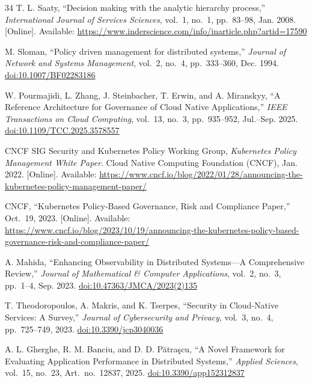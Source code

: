\documentclass[conference]{IEEEtran}
\begin{document}
\begin{thebibliography}{34}
T. L. Saaty, ``Decision making with the analytic hierarchy process,'' \textit{International Journal of Services Sciences}, vol.~1, no.~1, pp.~83--98, Jan. 2008. [Online]. Available:
\url{https://www.inderscience.com/info/inarticle.php?artid=17590}

M. Sloman, ``Policy driven management for distributed systems,'' \textit{Journal of Network and Systems Management}, vol.~2, no.~4, pp.~333--360, Dec. 1994.
\href{https://doi.org/10.1007/BF02283186}{doi:10.1007/BF02283186}

W. Pourmajidi, L. Zhang, J. Steinbacher, T. Erwin, and A. Miranskyy, ``A Reference Architecture for Governance of Cloud Native Applications,'' \textit{IEEE Transactions on Cloud Computing}, vol.~13, no.~3, pp.~935--952, Jul.--Sep. 2025.
\href{https://doi.org/10.1109/TCC.2025.3578557}{doi:10.1109/TCC.2025.3578557}

CNCF SIG Security and Kubernetes Policy Working Group, \textit{Kubernetes Policy Management White Paper}. Cloud Native Computing Foundation (CNCF), Jan. 2022. [Online]. Available:
\url{https://www.cncf.io/blog/2022/01/28/announcing-the-kubernetes-policy-management-paper/}

CNCF, ``Kubernetes Policy-Based Governance, Risk and Compliance Paper,'' Oct.~19, 2023. [Online]. Available:
\url{https://www.cncf.io/blog/2023/10/19/announcing-the-kubernetes-policy-based-governance-risk-and-compliance-paper/}

A. Mahida, ``Enhancing Observability in Distributed Systems---A Comprehensive Review,'' \textit{Journal of Mathematical \& Computer Applications}, vol.~2, no.~3, pp.~1--4, Sep. 2023.
\href{https://doi.org/10.47363/JMCA/2023(2)135}{doi:10.47363/JMCA/2023(2)135}

T. Theodoropoulos, A. Makris, and K. Tserpes, ``Security in Cloud-Native Services: A Survey,'' \textit{Journal of Cybersecurity and Privacy}, vol.~3, no.~4, pp.~725--749, 2023.
\href{https://doi.org/10.3390/jcp3040036}{doi:10.3390/jcp3040036}

A. L. Gherghe, R. M. Banciu, and D. D. P{\u{a}}tra{\c{s}}cu, ``A Novel Framework for Evaluating Application Performance in Distributed Systems,'' \textit{Applied Sciences}, vol.~15, no.~23, Art.~no.~12837, 2025.
\href{https://doi.org/10.3390/app152312837}{doi:10.3390/app152312837}

\end{thebibliography}
\end{document}
